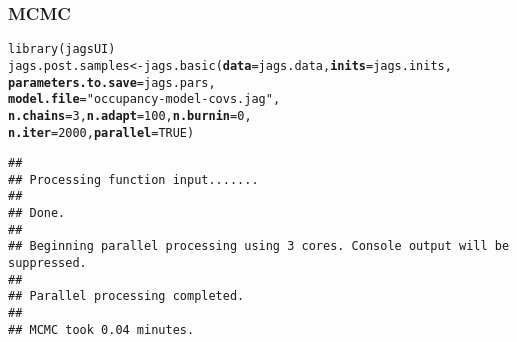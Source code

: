 \documentclass[color=usenames,dvipsnames]{beamer}\usepackage[]{graphicx}\usepackage[]{color}
\makeatletter
\newcommand{\hlnum}[1]{\textcolor[rgb]{0.69,0.494,0}{#1}}%
\newcommand{\hlstr}[1]{\textcolor[rgb]{0.749,0.012,0.012}{#1}}%
\newcommand{\hlstd}[1]{\textcolor[rgb]{0,0,0}{#1}}%
\newcommand{\hlkwb}[1]{\textcolor[rgb]{0,0.341,0.682}{#1}}%
\newcommand{\hlkwc}[1]{\textcolor[rgb]{0,0,0}{\textbf{#1}}}%
\newcommand{\hlkwd}[1]{\textcolor[rgb]{0.004,0.004,0.506}{#1}}%
\newenvironment{kframe}{%
 \def\at@end@of@kframe{}%
 \ifinner\ifhmode%
  \def\at@end@of@kframe{\end{minipage}}%
  \begin{minipage}{\columnwidth}%
 \fi\fi%
 \def\FrameCommand##1{\hskip\@totalleftmargin \hskip-\fboxsep
 \colorbox{shadecolor}{##1}\hskip-\fboxsep
     \hskip-\linewidth \hskip-\@totalleftmargin \hskip\columnwidth}%
 \MakeFramed {\advance\hsize-\width
   \@totalleftmargin\z@ \linewidth\hsize
   \@setminipage}}%
 {\par\unskip\endMakeFramed%
 \at@end@of@kframe}
\newenvironment{knitrout}{}{} %
\makeatother
\begin{document}
\begin{frame}[fragile]
  \frametitle{MCMC}
  \small
\begin{knitrout}\scriptsize
{}\color{fgcolor}\begin{kframe}
\begin{alltt}
\hlkwd{library}\hlstd{(jagsUI)}
\hlstd{jags.post.samples} \hlkwb{<-} \hlkwd{jags.basic}\hlstd{(}\hlkwc{data}\hlstd{=jags.data,} \hlkwc{inits}\hlstd{=jags.inits,}
                                \hlkwc{parameters.to.save}\hlstd{=jags.pars,}
                                \hlkwc{model.file}\hlstd{=}\hlstr{"occupancy-model-covs.jag"}\hlstd{,}
                                \hlkwc{n.chains}\hlstd{=}\hlnum{3}\hlstd{,} \hlkwc{n.adapt}\hlstd{=}\hlnum{100}\hlstd{,} \hlkwc{n.burnin}\hlstd{=}\hlnum{0}\hlstd{,}
                                \hlkwc{n.iter}\hlstd{=}\hlnum{2000}\hlstd{,} \hlkwc{parallel}\hlstd{=}\hlnum{TRUE}\hlstd{)}
\end{alltt}
\begin{verbatim}
## 
## Processing function input....... 
## 
## Done. 
##  
## Beginning parallel processing using 3 cores. Console output will be suppressed.
## 
## Parallel processing completed.
## 
## MCMC took 0.04 minutes.
\end{verbatim}
\end{kframe}
\end{knitrout}
\end{frame}
\end{document}
